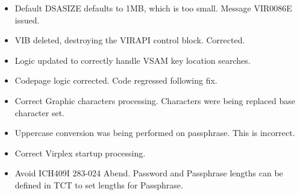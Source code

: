\documentclass[letterpaper,10pt,english]{sphinxmanual}
\begin{document}
\begin{itemize}
\item {} 
Default DSASIZE defaults to 1MB, which is too small. Message VIR0086E issued.

\end{itemize}

\begin{itemize}
\item {} 
VIB deleted, destroying the VIRAPI control block. Corrected.

\end{itemize}

\begin{itemize}
\item {} 
Logic updated to correctly handle VSAM key location searches.

\end{itemize}

\begin{itemize}
\item {} 
Codepage logic corrected. Code regressed following fix.

\end{itemize}

\begin{itemize}
\item {} 
Correct Graphic characters processing. Characters were being replaced base character set.

\end{itemize}

\begin{itemize}
\item {} 
Uppercase conversion was being performed on passphrase. This is incorrect.

\end{itemize}

\begin{itemize}
\item {} 
Correct Virplex startup processing.

\end{itemize}

\begin{itemize}
\item {} 
Avoid ICH409I 283-024 Abend. Password and Passphrase lengths can be defined in TCT to set lengths for Passphrase.

\end{itemize}
\end{document}
